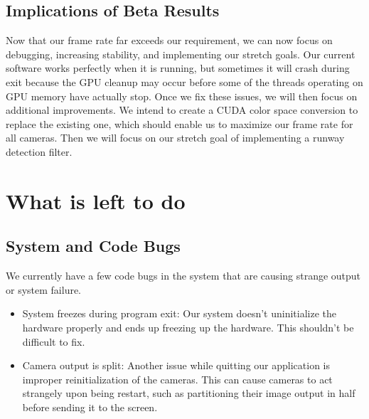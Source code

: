 \documentclass[letterpaper,10pt,titlepage]{IEEEtran}
\begin{document}
  \subsection{Implications of Beta Results}
  Now that our frame rate far exceeds our requirement, we can now focus on debugging, increasing stability, and implementing our stretch goals. Our current software works perfectly when it is running, but sometimes it will crash during exit because the GPU cleanup may occur before some of the threads operating on GPU memory have actually stop. Once we fix these issues, we will then focus on additional improvements. We intend to create a CUDA color space conversion to replace the existing one, which should enable us to maximize our frame rate for all cameras. Then we will focus on our stretch goal of implementing a runway detection filter.
  
  
\section{What is left to do}
	\subsection{System and Code Bugs}
	We currently have a few code bugs in the system that are causing strange output or system failure.\\
	\begin{itemize}
		\item System freezes during program exit: Our system doesn't uninitialize the hardware properly and ends up freezing up the hardware. This shouldn't be difficult to fix.
		\item Camera output is split: Another issue while quitting our application is improper reinitialization of the cameras. This can cause cameras to act strangely upon being restart, such as partitioning their image output in half before sending it to the screen.
	\end{itemize}
	
\end{document}
